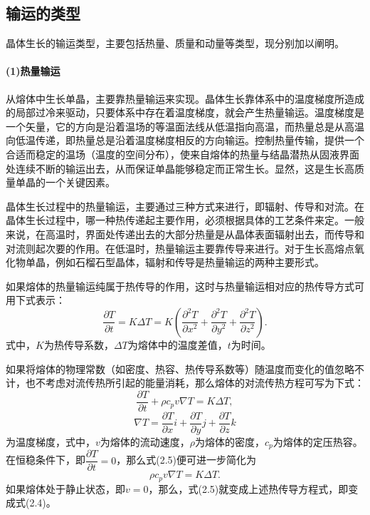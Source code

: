 \subsection{输运的类型}
晶体生长的输运类型，主要包括热量、质量和动量等类型，现分别加以阐明。

\paragraph{(1)热量输运}从熔体中生长单晶，主要靠热量输运来实现。晶体生长靠体系中的温度梯度所造成的局部过冷来驱动，只要体系中存在着温度梯度，就会产生热量输运。温度梯度是一个矢量，它的方向是沿着温场的等温面法线从低温指向高温，而热量总是从高温向低温传递，即热量总是沿着温度梯度相反的方向输运。控制热量传输，提供一个合适而稳定的温场（温度的空间分布），使来自熔体的热量与结晶潜热从固液界面处连续不断的输运出去，从而保证单晶能够稳定而正常生长。显然，这是生长高质量单晶的一个关键因素。

晶体生长过程中的热量输运，主要通过三种方式来进行，即辐射、传导和对流。在晶体生长过程中，哪一种热传递起主要作用，必须根据具体的工艺条件来定。一般来说，在高温时，界面处传递出去的大部分热量是从晶体表面辐射出去，而传导和对流则起次要的作用。在低温时，热量输运主要靠传导来进行。对于生长高熔点氧化物单晶，例如石榴石型晶体，辐射和传导是热量输运的两种主要形式。

如果熔体的热量输运纯属于热传导的作用，这时与热量输运相对应的热传导方式可用下式表示：
\begin{equation}
\frac{\partial T}{\partial t}=K\Delta T=K(\frac{\partial^2T}{\partial x^2}+\frac{\partial^2T}{\partial y^2}+\frac{\partial^2T}{\partial z^2}).
\end{equation}
式中，$K$为热传导系数，$\Delta T$为熔体中的温度差值，$t$为时间。

如果将熔体的物理常数（如密度、热容、热传导系数等）随温度而变化的值忽略不计，也不考虑对流传热所引起的能量消耗，那么熔体的对流传热方程可写为下式：
\begin{equation}
\frac{\partial T}{\partial t}+\rho c_pv\nabla T=K\Delta T,
\end{equation}
$$\nabla T=\frac{\partial T}{\partial x}i+\frac{\partial T}{\partial y}j+\frac{\partial T}{\partial z}k$$
为温度梯度，式中，$v$为熔体的流动速度，$\rho$为熔体的密度，$c_p$为熔体的定压热容。
在恒稳条件下，即$\dfrac{\partial T}{\partial t}=0$，那么式(2.5)便可进一步简化为
\begin{equation}
\rho c_pv\nabla T=K\Delta T.
\end{equation}
如果熔体处于静止状态，即$v=0$，那么，式(2.5)就变成上述热传导方程式，即变成式(2.4)。

